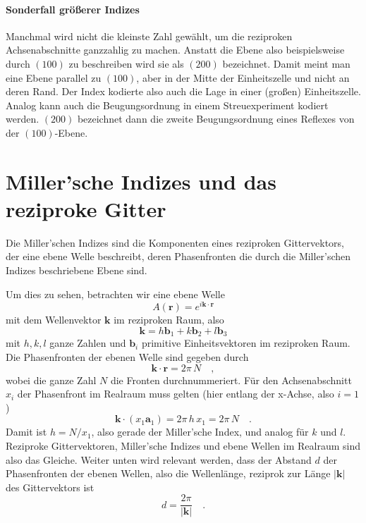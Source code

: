 \paragraph{Sonderfall größerer Indizes} Manchmal wird nicht die kleinste Zahl gewählt, um die reziproken Achsenabschnitte ganzzahlig zu machen. Anstatt die Ebene also beispielsweise durch $(100)$ zu beschreiben wird sie als $(200)$ bezeichnet. Damit meint man eine Ebene parallel zu $(100)$, aber in der Mitte der Einheitszelle und nicht an deren Rand. Der Index kodierte also auch die Lage in einer (großen) Einheitszelle. Analog kann auch die Beugungsordnung in einem Streuexperiment kodiert werden. $(200)$  bezeichnet dann die zweite Beugungsordnung eines Reflexes von der $(100)$-Ebene.


\section{Miller'sche Indizes und das reziproke Gitter}

Die Miller'schen Indizes sind die Komponenten eines reziproken Gittervektors, der eine ebene Welle beschreibt, deren Phasenfronten die durch die Miller'schen Indizes beschriebene Ebene sind.

Um dies zu sehen, betrachten wir eine ebene Welle 
\begin{equation}
 A(\mathbf{r}) = e^{i \mathbf{k} \cdot \mathbf{r}}
\end{equation}
mit dem Wellenvektor $\mathbf{k}$ im reziproken Raum, also
\begin{equation}
\mathbf{k} = h \mathbf{b}_1 + k \mathbf{b}_2  +l  \mathbf{b}_3 
\end{equation}
mit $h,k,l$ ganze Zahlen und $ \mathbf{b}_i$ primitive Einheitsvektoren im reziproken Raum. Die Phasenfronten der ebenen Welle sind gegeben durch
\begin{equation}
\mathbf{k} \cdot \mathbf{r} = 2 \pi \, N \quad ,
\end{equation}
wobei die ganze Zahl $N$ die Fronten durchnummeriert. Für den Achsenabschnitt $x_i$ der Phasenfront im Realraum muss gelten (hier entlang der x-Achse, also $i=1$)
\begin{equation}
 \mathbf{k} \cdot (x_1 \mathbf{a}_1) = 2 \pi \, h \, x_1 = 2 \pi \, N \quad .
\end{equation}
Damit ist $h = N / x_1$, also gerade der Miller'sche Index, und analog für $k$ und $l$. Reziproke Gittervektoren, Miller'sche Indizes und ebene Wellen im Realraum sind also das Gleiche. Weiter unten wird relevant werden, dass der Abstand $d$  der Phasenfronten der ebenen Wellen, also die Wellenlänge, reziprok zur Länge $| \mathbf{k} |$ des Gittervektors ist
\begin{equation}
 d = \frac{2 \pi}{| \mathbf{k} |} \quad .
\end{equation}


